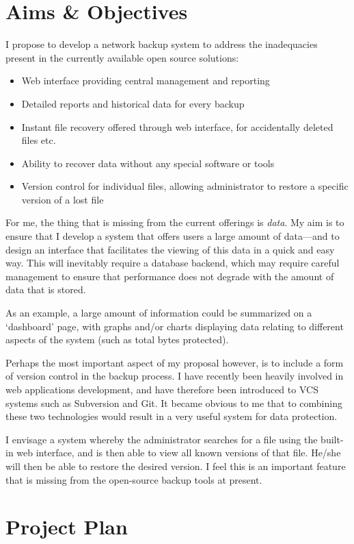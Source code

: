 \documentclass[a4paper]{article}
\begin{document}
    \section{Aims \& Objectives}
    I propose to develop a network backup system to address the inadequacies
    present in the currently available open source solutions:

    \begin{itemize}
        \item Web interface providing central management and reporting
        \item Detailed reports and historical data for every backup
        \item Instant file recovery offered through web interface, for
            accidentally deleted files etc.
        \item Ability to recover data without any special software or tools
        \item Version control for individual files, allowing administrator to
            restore a specific version of a lost file
    \end{itemize}

    For me, the thing that is missing from the current offerings is
    \emph{data}. My aim is to ensure that I develop a system that offers users
    a large amount of data---and to design an interface that facilitates the
    viewing of this data in a quick and easy way. This will inevitably require
    a database backend, which may require careful management to ensure that
    performance does not degrade with the amount of data that is stored.

    As an example, a large amount of information could be summarized on
    a `dashboard' page, with graphs and/or charts displaying data relating to
    different aspects of the system (such as total bytes protected).

    Perhaps the most important aspect of my proposal however, is to include
    a form of version control in the backup process. I have recently been
    heavily involved in web applications development, and have therefore been
    introduced to VCS systems such as Subversion and Git. It became obvious to
    me that to combining these two technologies would result in a very useful
    system for data protection.

    I envisage a system whereby the administrator searches for a file using the
    built-in web interface, and is then able to view all known versions of that
    file. He/she will then be able to restore the desired version. I feel this
    is an important feature that is missing from the open-source backup tools
    at present.

    \section{Project Plan}
\end{document}
